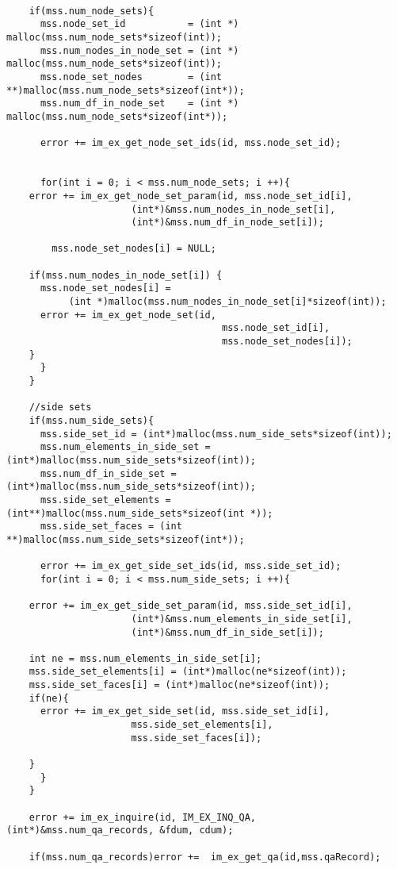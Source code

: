 \begin{Verbatim}[fontsize=\small]
      
    if(mss.num_node_sets){
      mss.node_set_id           = (int *) malloc(mss.num_node_sets*sizeof(int));
      mss.num_nodes_in_node_set = (int *) malloc(mss.num_node_sets*sizeof(int));
      mss.node_set_nodes        = (int **)malloc(mss.num_node_sets*sizeof(int*));
      mss.num_df_in_node_set    = (int *) malloc(mss.num_node_sets*sizeof(int*));
      
      error += im_ex_get_node_set_ids(id, mss.node_set_id);


      for(int i = 0; i < mss.num_node_sets; i ++){
	error += im_ex_get_node_set_param(id, mss.node_set_id[i],
					  (int*)&mss.num_nodes_in_node_set[i], 
					  (int*)&mss.num_df_in_node_set[i]);

      	mss.node_set_nodes[i] = NULL;

	if(mss.num_nodes_in_node_set[i]) {
	  mss.node_set_nodes[i] = 
           (int *)malloc(mss.num_nodes_in_node_set[i]*sizeof(int));
	  error += im_ex_get_node_set(id, 
                                      mss.node_set_id[i], 
                                      mss.node_set_nodes[i]);
	}
      }
    }

    //side sets
    if(mss.num_side_sets){
      mss.side_set_id = (int*)malloc(mss.num_side_sets*sizeof(int));
      mss.num_elements_in_side_set = (int*)malloc(mss.num_side_sets*sizeof(int));
      mss.num_df_in_side_set = (int*)malloc(mss.num_side_sets*sizeof(int));
      mss.side_set_elements = (int**)malloc(mss.num_side_sets*sizeof(int *));
      mss.side_set_faces = (int **)malloc(mss.num_side_sets*sizeof(int*));

      error += im_ex_get_side_set_ids(id, mss.side_set_id);
      for(int i = 0; i < mss.num_side_sets; i ++){
	  
	error += im_ex_get_side_set_param(id, mss.side_set_id[i], 
					  (int*)&mss.num_elements_in_side_set[i],
					  (int*)&mss.num_df_in_side_set[i]);

	int ne = mss.num_elements_in_side_set[i];
	mss.side_set_elements[i] = (int*)malloc(ne*sizeof(int));
	mss.side_set_faces[i] = (int*)malloc(ne*sizeof(int));
	if(ne){
	  error += im_ex_get_side_set(id, mss.side_set_id[i], 
				      mss.side_set_elements[i], 
				      mss.side_set_faces[i]);

	}
      }
    }
      
    error += im_ex_inquire(id, IM_EX_INQ_QA, (int*)&mss.num_qa_records, &fdum, cdum);

    if(mss.num_qa_records)error +=  im_ex_get_qa(id,mss.qaRecord);



\end{Verbatim}
